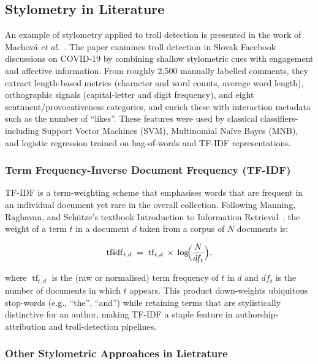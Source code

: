 \documentclass[twoside]{ctuthesis}
\theoremstyle{plain}
\theoremstyle{definition}
\theoremstyle{note}
\begin{document}
\subsection{Stylometry in Literature}

An example of stylometry applied to troll detection is presented in the work of Machová \textit{et al.}~\cite{Machova2021Algorithms}. The paper examines troll detection in Slovak Facebook discussions on COVID-19 by combining shallow stylometric cues with engagement and affective information.  From roughly 2,500 manually labelled comments, they extract length-based metrics (character and word counts, average word length), orthographic signals (capital-letter and digit frequency), and eight sentiment/provocativeness categories, and enrich these with interaction metadata such as the number of “likes”. These features were used by classical classifiers-including Support Vector Machines (SVM), Multinomial Naïve Bayes (MNB), and logistic regression trained on bag-of-words and TF-IDF representations. 

\subsubsection{Term Frequency-Inverse Document Frequency (TF-IDF)}
\label{subsec:tfidf}
TF-IDF is a term-weighting scheme that emphasises words that are frequent in an individual document yet rare in the overall collection.  
Following Manning, Raghavan, and Schütze's textbook Introduction to Information Retrieval~\cite{Manning2009}, the weight of a term \(t\) in a document \(d\) taken from a corpus of \(N\) documents is:

\[
\operatorname{tf\!-\!idf}_{t,d} 
\;=\;
\operatorname{tf}_{t,d}
\;\times\;
\log\!\Bigl(\frac{N}{df_t}\Bigr),
\]

where \(\operatorname{tf}_{t,d}\) is the (raw or normalised) term frequency of \(t\) in \(d\) and \(df_t\) is the number of documents in which \(t\) appears.  
This product down-weights ubiquitous stop-words (e.g., “the”, “and”) while retaining terms that are stylistically distinctive for an author, making TF-IDF a staple feature in authorship-attribution and troll-detection pipelines.


\subsubsection{Other Stylometric Approahces in Lietrature}
\end{document}
